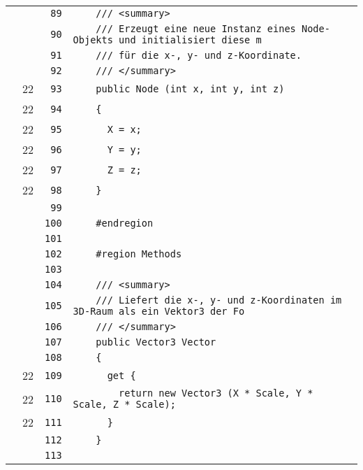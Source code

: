 \documentclass[a4paper,10pt]{article}
\begin{document}
\begin{longtable}[l]{lrrl}
\cellcolor{gray} &  & \verb~89~ & \verb~    /// <summary>~\\
\cellcolor{gray} &  & \verb~90~ & \verb~    /// Erzeugt eine neue Instanz eines Node-Objekts und initialisiert diese m~\\
\cellcolor{gray} &  & \verb~91~ & \verb~    /// für die x-, y- und z-Koordinate.~\\
\cellcolor{gray} &  & \verb~92~ & \verb~    /// </summary>~\\
\cellcolor{green} & 22 & \verb~93~ & \verb~    public Node (int x, int y, int z)~\\
\cellcolor{green} & 22 & \verb~94~ & \verb~    {~\\
\cellcolor{green} & 22 & \verb~95~ & \verb~      X = x;~\\
\cellcolor{green} & 22 & \verb~96~ & \verb~      Y = y;~\\
\cellcolor{green} & 22 & \verb~97~ & \verb~      Z = z;~\\
\cellcolor{green} & 22 & \verb~98~ & \verb~    }~\\
\cellcolor{gray} &  & \verb~99~ & \verb~~\\
\cellcolor{gray} &  & \verb~100~ & \verb~    #endregion~\\
\cellcolor{gray} &  & \verb~101~ & \verb~~\\
\cellcolor{gray} &  & \verb~102~ & \verb~    #region Methods~\\
\cellcolor{gray} &  & \verb~103~ & \verb~~\\
\cellcolor{gray} &  & \verb~104~ & \verb~    /// <summary>~\\
\cellcolor{gray} &  & \verb~105~ & \verb~    /// Liefert die x-, y- und z-Koordinaten im 3D-Raum als ein Vektor3 der Fo~\\
\cellcolor{gray} &  & \verb~106~ & \verb~    /// </summary>~\\
\cellcolor{gray} &  & \verb~107~ & \verb~    public Vector3 Vector~\\
\cellcolor{gray} &  & \verb~108~ & \verb~    {~\\
\cellcolor{green} & 22 & \verb~109~ & \verb~      get {~\\
\cellcolor{green} & 22 & \verb~110~ & \verb~        return new Vector3 (X * Scale, Y * Scale, Z * Scale);~\\
\cellcolor{green} & 22 & \verb~111~ & \verb~      }~\\
\cellcolor{gray} &  & \verb~112~ & \verb~    }~\\
\cellcolor{gray} &  & \verb~113~ & \verb~~\\

\end{longtable}
\end{document}

